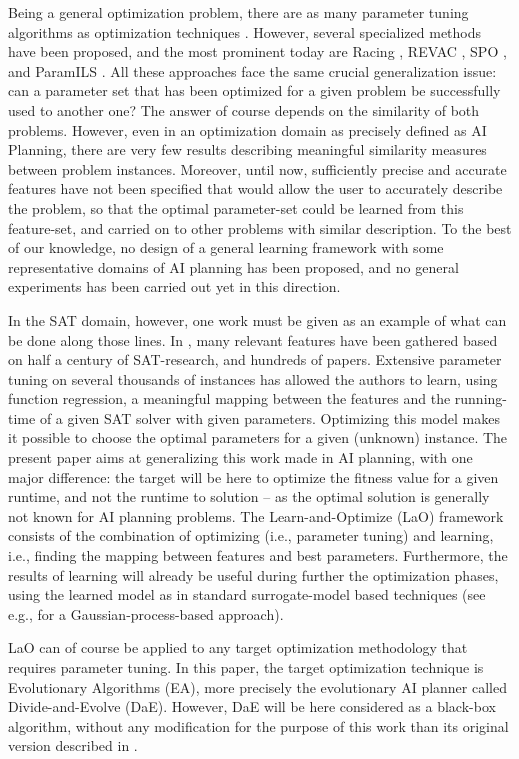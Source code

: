\documentclass[letterpaper]{article}
\begin{document}
Being a general optimization problem, there are as many parameter tuning algorithms as optimization techniques \cite{Eiben2007,Montero:2010}. However, several specialized methods have been proposed, and the most prominent today are Racing \cite{birattari2002}, REVAC \cite{Nannen07}, SPO \cite{SPO:CEC05}, and ParamILS \cite{ParamILS-JAIR}. All these approaches face the same crucial generalization issue: can a parameter set that has been optimized for a given problem be successfully used to another one? The answer of course depends on the similarity of both problems. However, even in an optimization domain as precisely defined as AI Planning, there are very few results describing meaningful similarity measures between problem instances. Moreover, until now, sufficiently precise and accurate features have not been specified that would allow the user to accurately describe the problem, so that the optimal parameter-set could be learned from this feature-set, and carried on to other problems with similar description. To the best of our knowledge, no design of a general learning framework with some representative domains of AI planning has been proposed, and no general experiments has been carried out yet in this direction.

In the SAT domain, however, one work must be given as an example of what can be done along those lines. In \cite{Hutter06}, many relevant features have been gathered based on half a century of SAT-research, and hundreds of papers. Extensive parameter tuning on several thousands of instances has allowed the authors to learn, using function regression, a meaningful mapping between the features and the running-time of a given SAT solver with given parameters. Optimizing this model makes it possible to choose the optimal parameters for a given (unknown) instance. The present paper aims at generalizing this work made in AI planning, with one major difference: the target will be here to optimize the fitness value for a given runtime, and not the runtime to solution -- as the optimal solution is generally not known for AI planning problems. The Learn-and-Optimize (LaO) framework consists of the combination of optimizing (i.e., parameter tuning) and learning, i.e., finding the mapping between features and best parameters. Furthermore, the results of learning will already be useful during further the optimization phases, using the learned model as in standard surrogate-model based techniques (see e.g., \cite{Bardenet} for a Gaussian-process-based approach).

LaO can of course be applied to any target optimization methodology that requires parameter tuning. In this paper, the target optimization technique is Evolutionary Algorithms (EA), more precisely the evolutionary AI planner called Divide-and-Evolve (DaE). However, DaE will be here considered as a black-box algorithm, without any modification for the purpose of this work than its original version described in \cite{BibEvoCop:2010}. 
\end{document}

